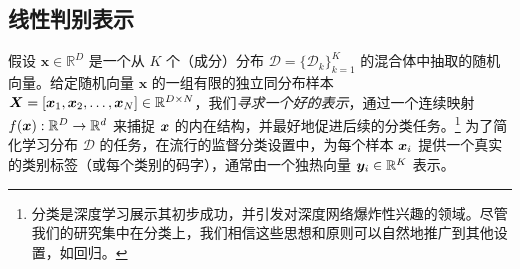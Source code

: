 \documentclass[../../book-main_zh.tex]{subfiles}
\begin{document}





\subsection{线性判别表示}\label{subsec:LDR}

假设 $\bm{x} \in \mathbb{R}^D$ 是一个从 $K$ 个（成分）分布 $\mathcal{D} = \{\mathcal{D}_k\}_{k=1}^K$ 的混合体中抽取的随机向量。给定随机向量 $\bm x$ 的一组有限的独立同分布样本 $\bm{X} = [\bm{x}_1, \bm{x}_2, \ldots, \bm{x}_N] \in \mathbb{R}^{D\times N}$，我们{\em 寻求一个好的表示}，通过一个连续映射 $f(\bm{x}): \mathbb{R}^D \rightarrow \mathbb{R}^d$ 来捕捉 $\bm{x}$ 的内在结构，并最好地促进后续的分类任务。\footnote{分类是深度学习展示其初步成功，并引发对深度网络爆炸性兴趣的领域。尽管我们的研究集中在分类上，我们相信这些思想和原则可以自然地推广到其他设置，如回归。} 为了简化学习分布 $\mathcal{D}$ 的任务，在流行的监督分类设置中，为每个样本 $\bm{x}_i$ 提供一个真实的类别标签（或每个类别的码字），通常由一个独热向量 $\bm{y}_i \in \mathbb{R}^K$ 表示。

 

\end{document}

